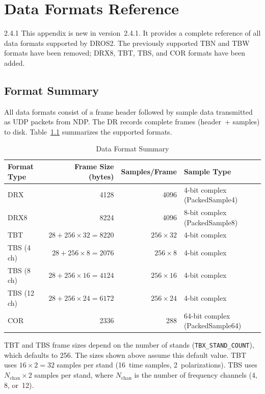 
\chapter{Data Formats Reference}
\label{app:data-formats}

\begin{newInVersion}{2.4.1}
This appendix is new in version~2.4.1.  It provides a complete reference of all
data formats supported by DROS2.  The previously supported TBN and TBW formats
have been removed; DRX8, TBT, TBS, and COR formats have been added.
\end{newInVersion}

\section{Format Summary}

All data formats consist of a frame header followed by sample data transmitted
as UDP packets from NDP.  The DR records complete frames (header~+ samples) to
disk.  Table~\ref{tab:format-summary} summarizes the supported formats.

\begin{longtable}{l r r l}
\caption{Data Format Summary}
\label{tab:format-summary} \\
\toprule
\textbf{Format Type} & \textbf{Frame Size (bytes)} & \textbf{Samples/Frame}
    & \textbf{Sample Type} \\
\midrule
\endfirsthead
\endhead
\bottomrule
\endfoot

DRX  & 4128  & 4096 & 4-bit complex (PackedSample4)  \\
DRX8 & 8224  & 4096 & 8-bit complex (PackedSample8)  \\
TBT  & $28 + 256 \times 32 = 8220$ & $256 \times 32$ & 4-bit complex  \\
TBS (4 ch)  & $28 + 256 \times 8 = 2076$   & $256 \times 8$  & 4-bit complex  \\
TBS (8 ch)  & $28 + 256 \times 16 = 4124$  & $256 \times 16$ & 4-bit complex  \\
TBS (12 ch) & $28 + 256 \times 24 = 6172$  & $256 \times 24$ & 4-bit complex  \\
COR  & 2336  & 288  & 64-bit complex (PackedSample64) \\

\end{longtable}

\begin{noteBox}
TBT and TBS frame sizes depend on the number of stands
(\texttt{TBX\_STAND\_COUNT}), which defaults to 256.  The sizes shown above
assume this default value.  TBT uses $16 \times 2 = 32$ samples per stand
(16~time samples, 2~polarizations).  TBS uses $N_\text{chan} \times 2$
samples per stand, where $N_\text{chan}$ is the number of frequency channels
(4, 8, or~12).
\end{noteBox}

